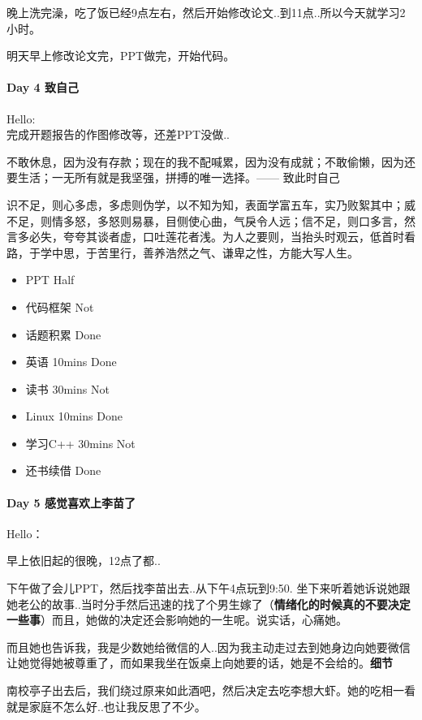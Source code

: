 \documentclass[UTF8,a4paper,8pt]{ctexbook}
\begin{document}
	 	 晚上洗完澡，吃了饭已经9点左右，然后开始修改论文..到11点..所以今天就学习2小时。
	 	 
	 	 明天早上修改论文完，PPT做完，开始代码。
 	 \paragraph{Day 4   致自己    \quad     }Hello: \\
	 	 完成开题报告的作图修改等，还差PPT没做..
	 	 
	 	 不敢休息，因为没有存款；现在的我不配喊累，因为没有成就；不敢偷懒，因为还要生活；一无所有就是我坚强，拼搏的唯一选择。—— 致此时自己
	 	 
	 	 识不足，则心多虑，多虑则伪学，以不知为知，表面学富五车，实乃败絮其中；威不足，则情多怒，多怒则易暴，目侧使心曲，气戾令人远；信不足，则口多言，然言多必失，夸夸其谈者虚，口吐莲花者浅。为人之要则，当抬头时观云，低首时看路，于学中思，于苦里行，善养浩然之气、谦卑之性，方能大写人生。
	 	 
	 	 \begin{itemize}
	 	 	\item  PPT	Half
	 	 	\item  代码框架 Not
	 	 	\item  话题积累 Done
	 	 	\item  英语 10mins Done
	 	 	\item  读书 30mins	Not
	 	 	\item  Linux 10mins	Done
	 	 	\item  学习C++ 30mins   Not
	 	 	\item  还书续借			Done
	 	 \end{itemize}
	 	 
 	 \paragraph{Day 5   感觉喜欢上李苗了    \quad     }
	 	 Hello：
	 	 
	 	 早上依旧起的很晚，12点了都..
	 	 
	 	 下午做了会儿PPT，然后找李苗出去..从下午4点玩到9:50. 坐下来听着她诉说她跟她老公的故事..当时分手然后迅速的找了个男生嫁了（\textbf{情绪化的时候真的不要决定一些事}）而且，她做的决定还会影响她的一生呢。说实话，心痛她。
	 	 
	 	 而且她也告诉我，我是少数她给微信的人..因为我主动走过去到她身边向她要微信让她觉得她被尊重了，而如果我坐在饭桌上向她要的话，她是不会给的。\textbf{细节}
	 	 
	 	 南校亭子出去后，我们绕过原来如此酒吧，然后决定去吃李想大虾。她的吃相一看就是家庭不怎么好..也让我反思了不少。
	 	 
\end{document}
